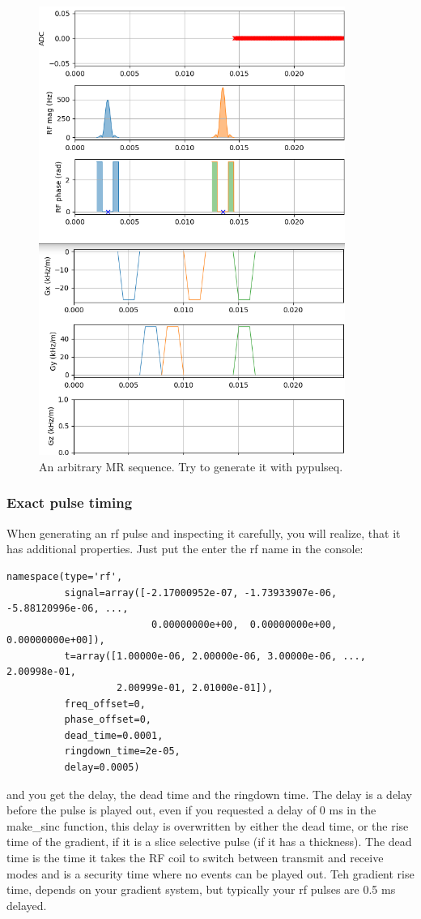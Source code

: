\documentclass[a4paper,12pt]{extarticle}
\begin{document}
\begin{figure}[H] 
\centering
\includegraphics[width=10cm]{img/ex_help02_pypulseq.png}
\caption{An arbitrary MR sequence. Try to generate it with pypulseq.} \label{fig:ex_help02}
\end{figure}


\subsubsection{Exact pulse timing}
When generating an rf pulse and inspecting it carefully, you will realize, that it has additional properties.
Just put the enter the rf name in the console:
\begin{verbatim}
namespace(type='rf',
          signal=array([-2.17000952e-07, -1.73933907e-06, -5.88120996e-06, ...,
                         0.00000000e+00,  0.00000000e+00,  0.00000000e+00]),
          t=array([1.00000e-06, 2.00000e-06, 3.00000e-06, ..., 2.00998e-01,
                   2.00999e-01, 2.01000e-01]),
          freq_offset=0,
          phase_offset=0,
          dead_time=0.0001,
          ringdown_time=2e-05,
          delay=0.0005)
\end{verbatim}
and you get the delay, the dead time and the ringdown time.
The delay is a delay before the pulse is played out, even if you requested a delay of 0 ms in the make\_sinc function, this delay is overwritten by either the dead time, or the rise time of the gradient, if it is a slice selective pulse (if it has a thickness).  The dead time is the time it takes the RF coil to switch between transmit and receive modes and is a security time where no events can be played out. Teh gradient rise time, depends on your gradient system, but typically your rf pulses are 0.5 ms delayed. 
\end{document}
